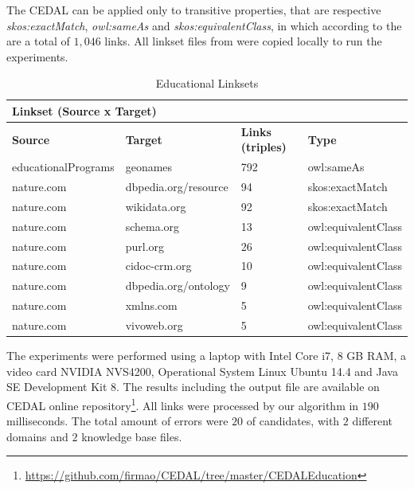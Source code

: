 The CEDAL can be applied only to transitive properties, that are respective \emph{skos:exactMatch}, \emph{owl:sameAs} and \emph{skos:equivalentClass}, in which according to the  are a total of $1,046$ links. All linkset files from were copied locally to run the experiments.

\begin{table}[htb] 
\centering
\caption{Educational Linksets}
\label{tab:linkTypes}
\begin{tabular}{@{}llll@{}}
\toprule
\multicolumn{2}{l}{\textbf{Linkset (Source x Target)}} &                          &                     \\ \midrule
\textbf{Source}           & \textbf{Target}            & \textbf{Links (triples)} & \textbf{Type}       \\
educationalPrograms       & geonames                   & 792                      & owl:sameAs          \\
nature.com                & dbpedia.org/resource       & 94                       & skos:exactMatch     \\
nature.com                & wikidata.org               & 92                       & skos:exactMatch     \\
nature.com                & schema.org                 & 13                       & owl:equivalentClass \\
nature.com                & purl.org                   & 26                       & owl:equivalentClass \\
nature.com                & cidoc-crm.org              & 10                       & owl:equivalentClass \\
nature.com                & dbpedia.org/ontology       & 9                        & owl:equivalentClass \\
nature.com                & xmlns.com                  & 5                        & owl:equivalentClass \\
nature.com                & vivoweb.org                & 5                        & owl:equivalentClass \\ \bottomrule
\end{tabular}
\end{table}
%
The experiments were performed using a laptop with Intel Core i7, 8 GB RAM, a video card NVIDIA NVS4200, Operational System Linux Ubuntu 14.4 and Java SE Development Kit 8. The results including the output file are available on CEDAL online repository\footnote{\url{https://github.com/firmao/CEDAL/tree/master/CEDALEducation}}.
All links were processed by our algorithm in $190$ milliseconds. The total amount of errors were $20$ of candidates, with $2$ different domains and $2$ knowledge base files.

